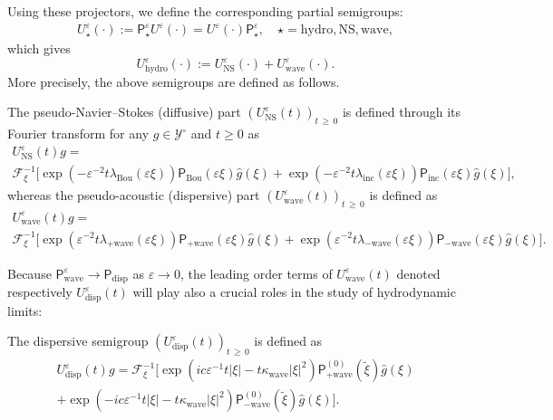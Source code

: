 \documentclass[AHL,Unicode,longabstracts,published]{cedram}
\newcommand{\ns}{\mathrm{NS}}
\newcommand{\hyd}{\mathrm{hydro}}
\newcommand{\Wave}{\mathrm{wave}}
\newcommand{\disp}{\mathrm{disp}}
\newcommand{\Inc}{\mathrm{inc}}
\newcommand{\Bou}{\mathrm{Bou}}
\newcommand{\FF}{\mathcal{F}}
\newcommand{\PP}{\mathsf{P}}
\newcommand{\VV}{\mathcal{Y}}
\newcommand{\SSgm}{\VV^{\circ}}
\renewcommand*\ge{\geqslant}
\newcommand*\eps{{\varepsilon}}
\begin{document}
Using these projectors, we define the corresponding partial semigroups:
\begin{gather*}
U^\eps_\star(\cdot):= \PP^\eps_\star U^\eps(\cdot) = U^\eps (\cdot)\PP^\eps_\star, \quad \star = \hyd, \ns, \Wave,
\end{gather*}
which gives
\begin{equation*}
U^\eps_\hyd(\cdot) := U^\eps_\ns(\cdot) + U^\eps_\Wave(\cdot).
\end{equation*}
More precisely, the above semigroups are defined as follows.
\begin{defi}\label{def:hydro_semigroups}
The pseudo-Navier--Stokes (diffusive) part $(U^\eps_\ns(t))_{t\,\ge\,0}$ is defined through its Fourier transform for any $g \in \SSgm$ and $t \ge 0$ as
\begin{multline}\label{eq:Unst}
U^\eps_\ns(t) g =\\
\FF_\xi^{-1} \Big[ \exp\left(- \eps^{-2} t \lambda_\Bou(\eps \xi) \right) \PP_\Bou(\eps \xi)\widehat{g}(\xi) 
 + \exp\left(- \eps^{-2} t \lambda_\Inc(\eps \xi) \right) \PP_\Inc(\eps \xi)\widehat{g}(\xi)\Big],
\end{multline}
whereas the pseudo-acoustic (dispersive) part $\left(U^\eps_\Wave(t)\right)_{t\,\ge\,0}$ is defined as
\begin{multline}\label{eq:UWave}
U^\eps_\Wave(t) g =\\
 \FF_\xi^{-1} \Big[ \exp\left(\eps^{-2} t \lambda_{+ \Wave}(\eps \xi) \right) \PP_{+ \Wave}(\eps \xi)\widehat{g}(\xi)
+ \exp\left(\eps^{-2} t \lambda_{- \Wave}(\eps \xi) \right) \PP_{- \Wave}(\eps \xi)\widehat{g}(\xi)\Big].
\end{multline}
\end{defi}

Because $\PP_\Wave^\eps \to \PP_\disp$ as $\eps \to 0$, the leading order terms of $U^\eps_\Wave(t)$ denoted respectively $U^\eps_\disp(t)$ will play also a crucial roles in the study of hydrodynamic limits:
\begin{defi}
The dispersive semigroup $(U^\eps_\disp(t))_{t\,\ge\,0}$ is defined as
\begin{multline*}
U^\eps_\disp(t)g =
\FF_\xi^{-1} \Big[ \exp\left(i c \eps^{-1} t|\xi| - t \kappa_\Wave | \xi |^2 \right) \PP^{(0)}_{+ \Wave}\left(\widetilde{\xi} \right) \widehat{g}(\xi)\\
+ \exp\left(- i c \eps^{-1} t|\xi| - t \kappa_\Wave | \xi |^2 \right) \PP^{(0)}_{- \Wave}\left(\widetilde{\xi} \right) \widehat{g}(\xi) \Big].
\end{multline*}
\end{defi}
\end{document}
